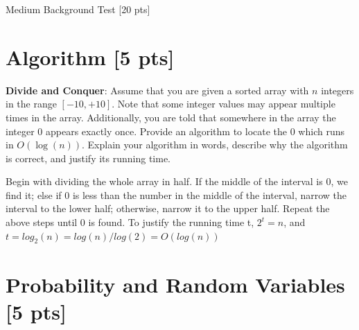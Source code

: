 \documentclass[a4paper]{article}
\theoremstyle{definition}
\newenvironment{soln}{
    \leavevmode\color{blue}\ignorespaces
}{}
\begin{document}
\clearpage  %



\begin{center}
\Huge
Medium Background Test [20 pts]
\end{center}

\section{Algorithm [5 pts]}
\textbf{Divide and Conquer}: Assume that you are given a sorted array
with $n$ integers in the range $[-10, +10]$. Note that some integer values
may appear multiple times in the array. Additionally, you are
told that somewhere in the array the integer $0$ appears exactly once. Provide an
algorithm to locate the $0$ which runs in $O(\log(n))$. Explain your
algorithm in words, describe why the algorithm is correct, and justify
its running time.\\

\begin{soln}
Begin with dividing the whole array in half. If the middle of the interval is 0, we find it; else if 0 is less than the number in the middle of the interval, narrow the interval to the lower half; otherwise, narrow it to the upper half. Repeat the above steps until 0 is found. To justify the running time t, $2^t = n$, and $t = log_2(n) = log(n)/log(2) = O(log(n))$
\end{soln}

\section{Probability and Random Variables [5 pts]}
\end{document}
